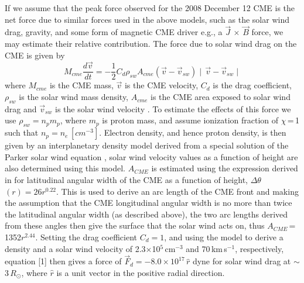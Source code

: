 \documentclass{emulateapj}
\begin{document}
If we assume that the peak force observed for the 2008 December 12 CME is the net force due to similar forces used in the above models, such as the solar wind drag, gravity, and some form of magnetic CME driver e.g., a $\vec{J}\,\times\,\vec{B}$ force, we may estimate their relative contribution.
The force due to solar wind drag on the CME is given by
\begin{equation}
M_{cme}\frac{d\vec{v}}{dt}=-\frac{1}{2}C_{d}\rho_{sw}A_{cme}(\vec{v}-\vec{v}_{sw})\mid\,\vec{v}-\vec{v}_{sw}\mid
\end{equation}
where $M_{cme}$ is the CME mass, $\vec{v}$ is the CME velocity, $C_{d}$ is the drag coefficient, $\rho_{sw}$ is the solar wind mass density, $A_{cme}$ is the CME area exposed to solar wind drag and $\vec{v}_{sw}$ is the solar wind velocity \citep{malo10}. To estimate the effects of this force we use $\rho_{sw}=n_{p}m_{p}$, where $m_{p}$ is proton mass, and assume ionization fraction of $\chi$\,=\,1 such that $n_{p}=n_{e}$\,$[cm^{-3}]$. Electron density, and hence proton density, is then given by an interplanetary density model derived from a special solution of the Parker solar wind equation \citep{Mann1999}, solar wind velocity values as a function of height are also determined using this model. $A_{CME}$ is estimated using the expression derived in \citet{byr10} for latitudinal angular width of the CME as a function of height, $\Delta$$\theta$$(r)=26r^{0.22}$. This is used to derive an arc length of the CME front and making the assumption that the CME longitudinal angular width is no more than twice the latitudinal angular width (as described above), the two arc lengths derived from these angles then give the surface that the solar wind acts on, thus $A_{CME}$\,=\,1352$r^{2.44}$. Setting the drag coefficient $C_{d}=1$, and using the \citet{Mann1999} model to derive a density and a solar wind velocity of 2.3$\times$10$^{5}$\,cm$^{-3}$  and 70\,km\,s$^{-1}$, respectively, equation [1] then gives a force of $\vec{F}_{d}=-8.0\times10^{17}\,\hat{r}\,$\,dyne for solar wind drag at $\sim$3\,$R_{\odot}$, where $\hat{r}$ is a unit vector in the positive radial direction. 
\end{document}
